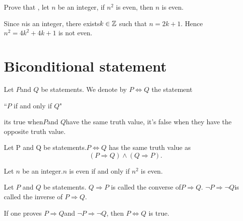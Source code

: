 \begin{exampleenv}
    Prove that , let $n$ be an integer,  if $n^2$ is even,  then $n$ is even.
\end{exampleenv}    
    \begin{proofenv}
        Since $n$is an integer,  there exists$k\in \mathbb{Z}$ such that $n=2k+1$. Hence $n^2=4k^2+4k+1$ is not even.
    \end{proofenv}




\section{Biconditional statement}
\begin{definitionenv}
    Let $P$and $Q$ be statements. We denote by $P\Leftrightarrow Q$ the statement
    \begin{center}
        ``$P$ if and only if $Q$"
    \end{center}
    its true when$P$and $Q$have the same truth value, it's false when they have the opposite truth value.
\end{definitionenv}
\begin{propositionenv}
    Let P and Q be statements.$P \Leftrightarrow Q$ has the same truth value as 
    $$(P\Rightarrow Q)\wedge (Q\Rightarrow P).$$
\end{propositionenv}
\begin{exampleenv}
    Let $n$ be an integer.$n$ is even if and only if $n^2$ is even.
\end{exampleenv}
\begin{definitionenv}
    Let $P$ and $Q$ be statements.
    \newline
    $Q\Rightarrow P$ is called the converse of$P\Rightarrow Q$.
    \newline
    $\neg P \Rightarrow \neg Q$is called the inverse of $P\Rightarrow Q$.
\end{definitionenv}
\begin{remark}
    If one proves $P\Rightarrow Q$and $\neg P\Rightarrow \neg Q$, then $P \Leftrightarrow Q$ is true.
\end{remark}




